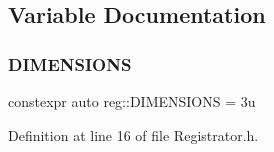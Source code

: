 \subsection{Variable Documentation}
\mbox{\label{namespacereg_a33163ef0ecb9428d5c82a09a19d6bf0c}} 
\subsubsection{\texorpdfstring{D\+I\+M\+E\+N\+S\+I\+O\+NS}{DIMENSIONS}}
{\footnotesize\ttfamily constexpr auto reg\+::\+D\+I\+M\+E\+N\+S\+I\+O\+NS = 3u}



Definition at line 16 of file Registrator.\+h.

